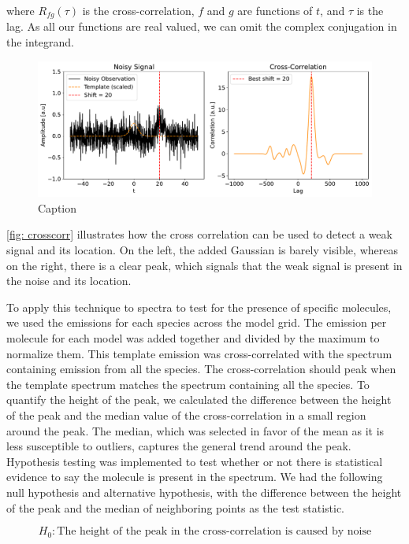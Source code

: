 \documentclass[twoside, single, authoryear, semicolon, 12pt]{lion-msc}
\newcommand{\4}{$_4$}
\newcommand{\3}{$_3$}
\newcommand{\2}{$_2$}
\begin{document}
where $R_{fg}(\tau)$ is the cross-correlation, $f$ and $g$ are functions of $t$, and $\tau$ is the lag. As all our functions are real valued, we can omit the complex conjugation in the integrand.

\begin{figure}[H]
    \centering
    \includegraphics[width=\linewidth]{Figures/Correlationexample.pdf}
    \caption{Caption}
    \label{fig: crosscorr vis}
\end{figure}

\autoref{fig: crosscorr} illustrates how the cross correlation can be used to detect a weak signal and its location. On the left, the added Gaussian is barely visible, whereas on the right, there is a clear peak, which signals that the weak signal is present in the noise and its location.

To apply this technique to spectra to test for the presence of specific molecules, we used the emissions for each species across the model grid. The emission per molecule for each model was added together and divided by the maximum to normalize them. This template emission was cross-correlated with the spectrum containing emission from all the species. The cross-correlation should peak when the template spectrum matches the spectrum containing all the species. To quantify the height of the peak, we calculated the difference between the height of the peak and the median value of the cross-correlation in a small region around the peak. The median, which was selected in favor of the mean as it is less susceptible to outliers, captures the general trend around the peak. Hypothesis testing was implemented to test whether or not there is statistical evidence to say the molecule is present in the spectrum. We had the following null hypothesis and alternative hypothesis, with the difference between the height of the peak and the median of neighboring points as the test statistic. 

\begin{equation}
    H_0: \text{The height of the peak in the cross-correlation is caused by noise}
\end{equation}
\end{document}
